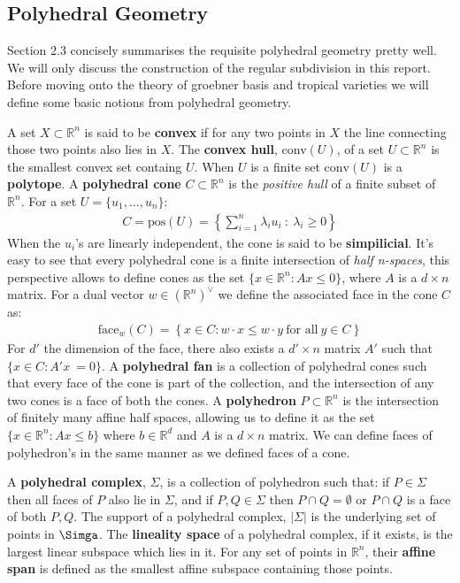     \subsection{Polyhedral Geometry}
    Section $2.3$ \cite{maclagan2015introduction} concisely summarises the requisite polyhedral geometry pretty well. We will only discuss the construction of the regular subdivision in this report.
   Before moving onto the theory of groebner basis and tropical varieties we will define some basic notions from polyhedral geometry.
   \par A set $X\subset \mathbb{R}^{n}$ is said to be \textbf{convex} if for any two points in $X$ the line connecting those two points also lies in $X$. 
   The \textbf{convex hull}, conv$(U)$, of a set $U\subset \mathbb{R}^{n}$ is the smallest convex set containg $U$.
   When $U$ is a finite set $\text{conv}(U)$ is a \textbf{polytope}. 
   A \textbf{polyhedral cone} $C \subset \mathbb{R}^{n}$ is the \textit{positive hull} of a finite subset of $\mathbb{R}^{n}$. 
   For a set $U = \{u_1,\dots,u_n\}$:
   \begin{align*}
       C = \text{pos}(U) = \left\{\sum_{i=1}^{n}\lambda_i u_i~:~\lambda_i\geq 0\right\}
   \end{align*}
   When the $u_i$'s are linearly independent, the cone is said to be \textbf{simpilicial}. 
    It's easy to see that every polyhedral cone is a finite intersection of \textit{half n-spaces}, this perspective allows to define cones as the set $\{x \in \mathbb{R}^{n}: Ax\leq 0\}$, where $A$ is a $d \times n$ matrix. 
    For a dual vector $w \in (\mathbb{R}^{n})^{\vee}$ we define the associated face in the cone $C$ as:
    \begin{align*}
        \text{face}_{w}(C) = \left\{x \in C: w\cdot x \leq w\cdot y ~\text{for all}~y \in C\right\}
    \end{align*}
    For $d'$ the dimension of the face, there also exists a $d'\times n$ matrix $A'$ such that $\{x \in C: A'x\ =  0\}$. 
    A \textbf{polyhedral fan} is a collection of polyhedral cones such that every face of the cone is part of the collection, and the intersection of any two cones is a face of both the cones.
    A \textbf{polyhedron} $P \subset \mathbb{R}^{n}$ is the intersection of finitely many affine half spaces, allowing us to define it as the set $\{x \in \mathbb{R}^{n}: Ax\leq b\}$ where $b \in \mathbb{R}^{d}$ and $A$ is a $d \times n$ matrix. We can define faces of polyhedron's in the same manner as we defined faces of a cone.
    \par A \textbf{polyhedral complex}, $\Sigma$, is a collection of polyhedron such that: if $P \in \Sigma$ then all faces of $P$ also lie in $\Sigma$, and if $P,Q \in \Sigma$ then $P \cap Q = \emptyset$ or $P \cap Q$ is a face of both $P,Q$. The support of a polyhedral complex, $|\Sigma |$ is the underlying set of points in $\Simga$. 
    The \textbf{lineality space} of a polyhedral complex, if it exists, is the largest linear subspace which lies in it.
    For any set of points in $\mathbb{R}^{n}$, their \textbf{affine span} is defined as the smallest affine subspace containing those points.


